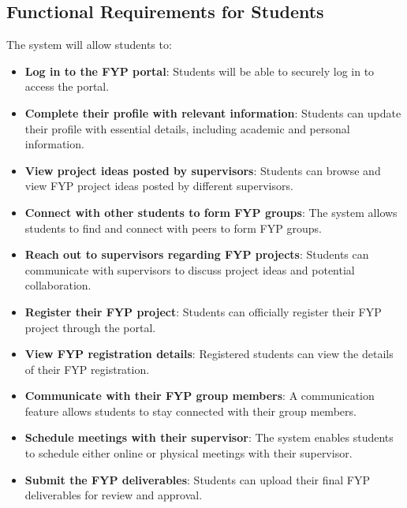 \documentclass{FastFyp}
\begin{document}
\subsection{Functional Requirements for Students}
The system will allow students to:
\begin{itemize}
    \item \textbf{Log in to the FYP portal}: Students will be able to securely log in to access the portal.
    \item \textbf{Complete their profile with relevant information}: Students can update their profile with essential details, including academic and personal information.
    \item \textbf{View project ideas posted by supervisors}: Students can browse and view FYP project ideas posted by different supervisors.
    \item \textbf{Connect with other students to form FYP groups}: The system allows students to find and connect with peers to form FYP groups.
    \item \textbf{Reach out to supervisors regarding FYP projects}: Students can communicate with supervisors to discuss project ideas and potential collaboration.
    \item \textbf{Register their FYP project}: Students can officially register their FYP project through the portal.
    \item \textbf{View FYP registration details}: Registered students can view the details of their FYP registration.
    \item \textbf{Communicate with their FYP group members}: A communication feature allows students to stay connected with their group members.
    \item \textbf{Schedule meetings with their supervisor}: The system enables students to schedule either online or physical meetings with their supervisor.
    \item \textbf{Submit the FYP deliverables}: Students can upload their final FYP deliverables for review and approval.
\end{itemize}
\end{document}
